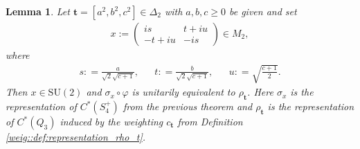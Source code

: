 \documentclass[a4paper]{amsart}
\newtheorem{lemma}[thm]{Lemma}
\begin{document}
\begin{lemma}
    \label{hyp::lemma:representation_rho_t_factors_thorugh_sigma_x}
    Let $\mathbf{t} = [a^2,b^2,c^2] \in \Delta_2$ with $a, b, c \geq 0$ be given and set
    \begin{align*}
        x := \begin{pmatrix}
            is & t + iu \\
            -t + iu & -is
        \end{pmatrix}
        \in M_2,
    \end{align*}
    where
    \begin{align*}
        s : = \frac{a}{\sqrt{2}\sqrt{c+1}},
        & & t : = \frac{b}{\sqrt{2}\sqrt{c+1}},
        & & u : = \sqrt{\frac{c+1}{2}}.
    \end{align*}
    Then $x \in \mathrm{SU}(2)$ and $\sigma_x \circ \varphi$ is unitarily equivalent to $\rho_\mathbf{t}$. Here $\sigma_x$ is the representation of $C^\ast(S_4^+)$ from the previous theorem and $\rho_\mathbf{t}$ is the representation of $C^\ast(Q_3)$ induced by the weighting $c_\mathbf{t}$ from Definition \ref{weig::def:representation_rho_t}.
\end{lemma}
\end{document}
